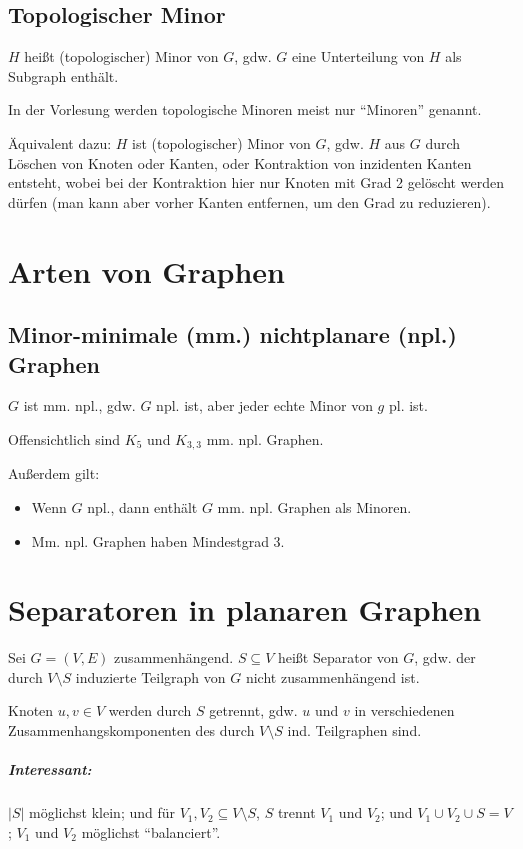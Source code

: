 \documentclass[a4paper,11pt]{report}
\begin{document}
\section{Topologischer Minor}
$H$ heißt (topologischer) Minor von $G$, gdw. $G$ eine Unterteilung von $H$ als Subgraph enthält.

In der Vorlesung werden topologische Minoren meist nur ``Minoren'' genannt.

Äquivalent dazu: $H$ ist (topologischer) Minor von $G$, gdw. $H$ aus $G$ durch Löschen von Knoten oder Kanten, oder Kontraktion von inzidenten Kanten entsteht, wobei bei der Kontraktion hier nur Knoten mit Grad 2 gelöscht werden dürfen (man kann aber vorher Kanten entfernen, um den Grad zu reduzieren).


\chapter{Arten von Graphen}
\section{Minor-minimale (mm.) nichtplanare (npl.) Graphen}
$G$ ist mm. npl., gdw. $G$ npl. ist, aber jeder echte Minor von $g$ pl. ist.

Offensichtlich sind $K_5$ und $K_{3, 3}$ mm. npl. Graphen.

Außerdem gilt:
\begin{itemize}
    \item Wenn $G$ npl., dann enthält $G$ mm. npl. Graphen als Minoren.
    \item Mm. npl. Graphen haben Mindestgrad 3.
\end{itemize}


\chapter{Separatoren in planaren Graphen}
Sei $G = (V, E)$ zusammenhängend. $S \subseteq V$ heißt Separator von $G$, gdw. der durch $V \setminus S$ induzierte Teilgraph von $G$ nicht zusammenhängend ist.

Knoten $u, v \in V$ werden durch $S$ getrennt, gdw. $u$ und $v$ in verschiedenen Zusammenhangskomponenten des durch $V \setminus S$ ind. Teilgraphen sind.

\paragraph{Interessant:} $|S|$ möglichst klein; und für $V_1, V_2 \subseteq V \setminus S$, $S$ trennt $V_1$ und $V_2$; und $V_1 \cup V_2 \cup S = V$; $V_1$ und $V_2$ möglichst ``balanciert''.
\end{document}
